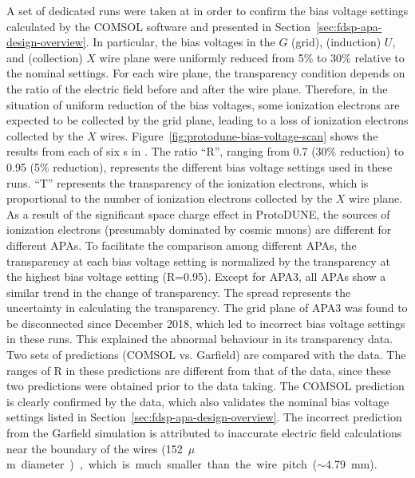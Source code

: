 A set of dedicated runs were taken at  in order to confirm the bias voltage settings calculated by the COMSOL software %
and presented in Section~\ref{sec:fdsp-apa-design-overview}. In particular, the bias voltages in the $G$ (grid), (induction) $U$, and (collection) $X$ wire plane were uniformly reduced from 5\% to 30\% relative to the nominal settings. For each wire plane, the transparency condition depends on the ratio of the electric field before and after the wire plane. Therefore, in the situation of uniform reduction of the bias voltages, some ionization electrons are expected to be collected by the grid plane, leading to a loss of ionization electrons collected by the $X$ wires. Figure~\ref{fig:protodune-bias-voltage-scan} shows the results from each of six s in . The ratio ``R'', ranging from 0.7 (30\% reduction) to 0.95 (5\% reduction), represents the different bias voltage settings used in these runs. ``T'' represents the transparency of the ionization electrons, which is proportional to the number of ionization electrons collected by the $X$ wire plane. As a result of the significant space charge effect in ProtoDUNE, the sources of ionization electrons (presumably dominated by cosmic muons) are different for different APAs. To facilitate the comparison among different APAs, the transparency at each bias voltage setting is normalized by the transparency at the highest bias voltage setting (R=0.95). Except for APA3, all APAs show a similar trend in the change of transparency. The spread represents the uncertainty in calculating the transparency. The grid plane of APA3 was found to be disconnected since December 2018, which led to incorrect bias voltage settings in these runs. This explained the abnormal behaviour in its transparency data. Two sets of predictions (COMSOL vs. Garfield) are compared with the  data. The ranges of R in these predictions are different from that of the  data, since these two predictions were obtained prior to the  data taking. The COMSOL prediction is clearly confirmed by the  data, which also validates the nominal bias voltage settings listed in Section~\ref{sec:fdsp-apa-design-overview}. The incorrect prediction from the Garfield simulation is attributed to inaccurate electric field calculations near the boundary of the wires (\SI{152}{$\mu$m} diameter), which is much smaller than the wire pitch ($\sim$\SI{4.79}{mm}). 

